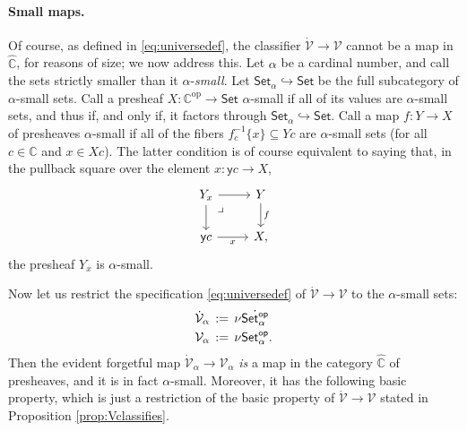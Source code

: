 \documentclass[12pt]{article}
\newcommand{\C}{\ensuremath{\boxempty}}
\newcommand{\bbC}{\ensuremath{\mathbb{C}}}
\newcommand{\Set}{\ensuremath{\mathsf{Set}}}
\newcommand{\y}{\ensuremath{\mathsf{y}}} %
\newcommand{\op}[1]{\ensuremath{{#1}^{\mathrm{op}}}}
\newcommand{\hook}{\ensuremath{\hookrightarrow}}
\renewcommand{\to}{\ensuremath{\rightarrow}}
\newcommand{\V}{\ensuremath{\mathcal{V}}}
\newcommand{\VV}{\ensuremath{\dot{\mathcal{V}}}}
\newcommand{\SSet}{\ensuremath{\,\dot{\Set}}}
\theoremstyle{remark}
\theoremstyle{definition}
\newcommand{\pbmark}{\ar[dr, phantom, "\lrcorner" very near start, shift right=.5ex]}	%
\begin{document}
\paragraph{Small maps.}
 
Of course, as defined in \eqref{eq:universedef}, the classifier $\VV\to\V$ cannot be a map in $\widehat{\bbC}$, for reasons of size; we now address this.  
Let $\alpha$ be a cardinal number, and call the sets strictly smaller than it $\alpha$-\emph{small}.  Let $\Set_\alpha\hook\Set$ be the full subcategory of $\alpha$-small sets.  
Call a presheaf $X : \op{\bbC} \to \Set$ $\alpha$-small if all of its values are $\alpha$-small sets, and thus if, and only if, it factors through $\Set_\alpha\hook\Set$. Call a map $f:Y\to X$ of presheaves $\alpha$-small if all of the fibers $f_c^{-1}\{ x\} \subseteq Yc$ are $\alpha$-small sets (for all $c\in\bbC$ and $x\in Xc$). The latter condition is of course equivalent to saying that, in the pullback square over the element $x:\y{c} \to X$, 
\begin{equation}\label{eq:smallmap}\textstyle
\begin{tikzcd}
	 Y_x \ar[d] \pbmark \ar[r] & Y \ar[d, "f"] \\  
	\y{c} \ar[r,swap,"x"] &  X,
 \end{tikzcd}
 \end{equation}
the presheaf $Y_x$ is $\alpha$-small.


Now let us restrict the specification \eqref{eq:universedef} of $\VV\to\V$ to the $\alpha$-small sets:
\begin{align}\label{eq:universedefalpha}\textstyle
\VV_\alpha\, &:=\, \nu \dot{\Set^{\mathsf{op}}_\alpha}\\  
\V_\alpha\, &:=\, \nu \Set^{\mathsf{op}}_\alpha. \notag
 \end{align}
Then the evident forgetful map $\VV_\alpha\to\V_\alpha$ \emph{is} a map in the category $\widehat{\bbC}$ of presheaves, and it is in fact $\alpha$-small. Moreover, it has the following basic property, which is just a restriction of the basic property of $\VV\to\V$ stated in Proposition \ref{prop:Vclassifies}.
\end{document}
